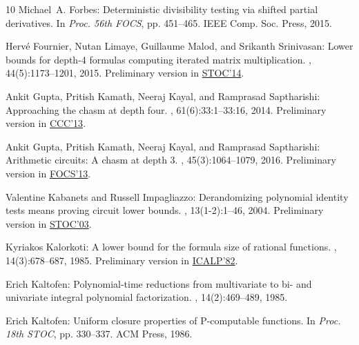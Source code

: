 \documentclass[11pt]{article}
\numberwithin{equation}{section}
\theoremstyle{definition}
\theoremstyle{plain}
\begin{document}
\begin{thebibliography}{10}
{\sc Michael~A. Forbes}: Deterministic divisibility testing via shifted partial
  derivatives.
\newblock In {\em Proc. 56th FOCS}, pp. 451--465. IEEE Comp. Soc. Press, 2015.

{\sc Herv{\'{e}} Fournier, Nutan Limaye, Guillaume Malod, and Srikanth
  Srinivasan}: Lower bounds for depth-4 formulas computing iterated matrix
  multiplication.
, 44(5):1173--1201, 2015.
\newblock Preliminary version in
  \href{https://dl.acm.org/citation.cfm?id=2591824}{STOC'14}.
\newblock [\epfmtdoi{10.1137/140990280}]

{\sc Ankit Gupta, Pritish Kamath, Neeraj Kayal, and Ramprasad Saptharishi}:
  Approaching the chasm at depth four.
, 61(6):33:1--33:16, 2014.
\newblock Preliminary version in
  \href{https://ieeexplore.ieee.org/document/6597750}{CCC'13}.
\newblock [\epfmtdoi{10.1145/2629541}]

{\sc Ankit Gupta, Pritish Kamath, Neeraj Kayal, and Ramprasad Saptharishi}:
  Arithmetic circuits: {A} chasm at depth 3.
, 45(3):1064--1079, 2016.
\newblock Preliminary version in
  \href{https://ieeexplore.ieee.org/document/6686194}{FOCS'13}.
\newblock [\epfmtdoi{10.1137/140957123}]

{\sc Valentine Kabanets and Russell Impagliazzo}: {D}erandomizing polynomial
  identity tests means proving circuit lower bounds.
, 13(1-2):1--46, 2004.
\newblock Preliminary version in
  \href{https://dl.acm.org/citation.cfm?id=780595}{STOC'03}.
\newblock [\epfmtdoi{10.1007/s00037-004-0182-6}]

{\sc Kyriakos Kalorkoti}: A lower bound for the formula size of rational
  functions.
, 14(3):678--687, 1985.
\newblock Preliminary version in
  \href{https://doi.org/10.1007/BFb0012780}{ICALP'82}.
\newblock [\epfmtdoi{10.1137/0214050}]

{\sc Erich Kaltofen}: Polynomial-time reductions from multivariate to bi- and
  univariate integral polynomial factorization.
, 14(2):469--489, 1985.
\newblock [\epfmtdoi{10.1137/0214035}]

{\sc Erich Kaltofen}: Uniform closure properties of {P}-computable functions.
\newblock In {\em Proc. 18th STOC}, pp. 330--337. ACM Press, 1986.
\newblock [\epfmtdoi{10.1145/12130.12163}]


\end{thebibliography}
\end{document}
